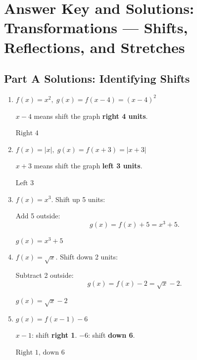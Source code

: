 \documentclass[14pt]{extarticle}
\begin{document}
\section*{Answer Key and Solutions: Transformations — Shifts, Reflections, and Stretches}

\subsection*{Part A Solutions: Identifying Shifts}
\begin{enumerate}
  \item \(f(x) = x^2,\; g(x) = f(x - 4) = (x - 4)^2\)

  \(x - 4\) means shift the graph \textbf{right 4 units}.

  \(\boxed{\text{Right 4}}\)

  \item \(f(x) = |x|,\; g(x) = f(x + 3) = |x + 3|\)

  \(x + 3\) means shift the graph \textbf{left 3 units}.

  \(\boxed{\text{Left 3}}\)

  \item \(f(x) = x^3\). Shift up 5 units:

  Add 5 outside:
  \[
  g(x) = f(x) + 5 = x^3 + 5.
  \]

  \(\boxed{g(x) = x^3 + 5}\)

  \item \(f(x) = \sqrt{x}\). Shift down 2 units:

  Subtract 2 outside:
  \[
  g(x) = f(x) - 2 = \sqrt{x} - 2.
  \]

  \(\boxed{g(x) = \sqrt{x} - 2}\)

  \item \(g(x) = f(x - 1) - 6\)

  \(x - 1\): shift \textbf{right 1}.  
  \(-6\): shift \textbf{down 6}.

  \(\boxed{\text{Right 1, down 6}}\)
\end{enumerate}
\end{document}
